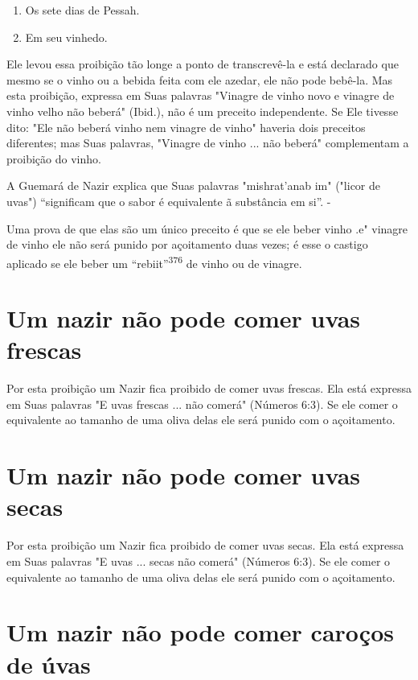\begin{enumerate}
\def\labelenumi{\arabic{enumi}.}
\setcounter{enumi}{373}
\item
 
 Os sete dias de Pessah.
 
\item
 
 Em seu vinhedo.
 
\end{enumerate}

Ele levou essa proibição tão longe a ponto de transcrevê-la e está
declarado que mesmo se o vinho ou a bebida feita com ele azedar, ele não
po­de bebê-la. Mas esta proibição, expressa em Suas palavras "Vinagre de
vinho novo e vinagre de vinho velho não beberá" (Ibid.), não é um
preceito indepen­dente. Se Ele tivesse dito: "Ele não beberá vinho nem
vinagre de vinho" have­ria dois preceitos diferentes; mas Suas palavras,
"Vinagre de vinho ... não be­berá" complementam a proibição do vinho.

A Guemará de Nazir explica que Suas palavras "mishrat'anab im" ("li­cor
de uvas") ``significam que o sabor é equivalente ã substância em si''. -

Uma prova de que elas são um único preceito é que se ele beber vi­nho
.e" vinagre de vinho ele não será punido por
açoitamento duas vezes; é esse o castigo aplicado se ele beber um
``rebiit''\textsuperscript{376} de vinho ou de vinagre.

\section{Um nazir não pode comer uvas frescas}

Por esta proibição um Nazir fica proibido de comer uvas frescas. Ela
está expressa em Suas palavras "E uvas frescas ... não comerá" (Números
6:3). Se ele comer o equivalente ao tamanho de uma oliva delas ele será
punido com o açoitamento.

\section{Um nazir não pode comer uvas secas}

Por esta proibição um Nazir fica proibido de comer uvas secas. Ela está
expressa em Suas palavras "E uvas ... secas não comerá" (Números 6:3).
Se ele comer o equivalente ao tamanho de uma oliva delas ele será punido
com o açoitamento.

\section{Um nazir não pode comer caroços de úvas}

